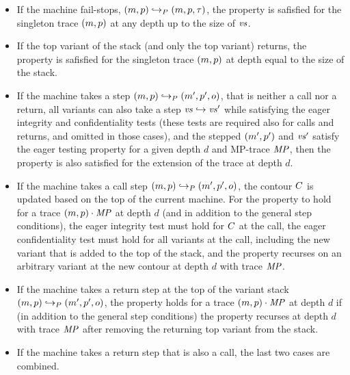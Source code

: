 \documentclass[acmsmall,review,anonymous]{acmart}\settopmatter{printfolios=true,printccs=false,printacmref=false}
\begin{document}
  \begin{itemize}

  \item If the machine fail-stops,
    $(m, p) \hookrightarrow_P (m, p, \tau)$,
    the property is safisfied for the singleton trace $(m, p)$ at any
    depth up to the size of $\mathit{vs}$.

  \item If the top variant of the stack (and only the top variant) returns,
    the property is safisfied for the singleton trace $(m, p)$ at depth
    equal to the size of the stack. 

  \item If the machine takes a step
    $(m, p) \hookrightarrow_P (m', p', o)$,
    that is neither a call nor a return, all
    variants can also take a step $\mathit{vs} \hookrightarrow \mathit{vs}'$ 
    while satisfying the eager integrity and confidentiality tests 
    (these tests are required also for calls and returns, and omitted in those cases),
    and the stepped $(m', p')$ and $\mathit{vs}'$ satisfy the eager testing property
    for a given depth $d$  and MP-trace $\mathit{MP}$,
    then the property is also satisfied for the extension of the trace 
    at depth $d$.

  \item If the machine takes a call step
    $(m, p) \hookrightarrow_P (m', p', o)$,
    the contour $C$ is updated based on the top of the current machine.
    For the property to hold for a trace $(m, p) \cdot \mathit{MP}$ at depth $d$
    (and in addition to the general step conditions),
    the eager integrity test must hold for $C$ at the call,
    the eager confidentiality test must hold for all variants at the call,
    including the new variant that is added to the top of the stack,
    and the property recurses on an arbitrary variant at the new contour
    at depth $d$ with trace $\mathit{MP}$.

  \item If the machine takes a return step at the top of the variant stack
    $(m, p) \hookrightarrow_P (m', p', o)$,
    the property holds for a trace $(m, p) \cdot \mathit{MP}$ at depth $d$
    if (in addition to the general step conditions)
    the property recurses at depth $d$ with trace $\mathit{MP}$
    after removing the returning top variant from the stack.

  \item If the machine takes a return step that is also a call, the last two
    cases are combined.

  \end{itemize}
\end{document}

